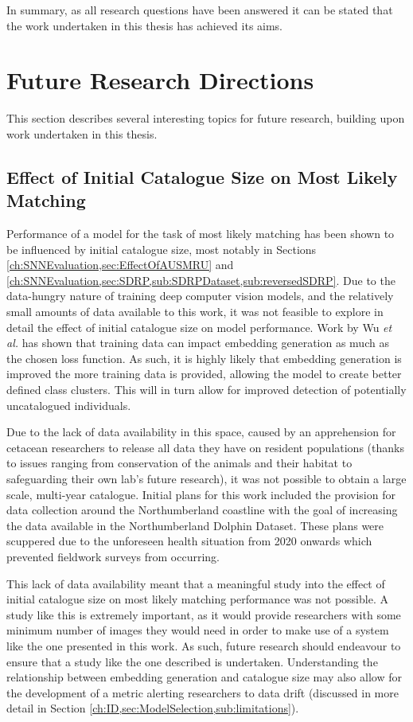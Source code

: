 In summary, as all research questions have been answered it can be stated that the work undertaken in this thesis has achieved its aims. 

\section{Future Research Directions}\label{ch:Conclusion,sec:FutureWork}

This section describes several interesting topics for future research, building upon work undertaken in this thesis.

\subsection{Effect of Initial Catalogue Size on Most Likely Matching}\label{ch:Conclusion,sec:FutureWork,sub:EffectOfCatalogueSize}

Performance of a model for the task of most likely matching has been shown to be influenced by initial catalogue size, most notably in Sections \ref{ch:SNNEvaluation,sec:EffectOfAUSMRU} and \ref{ch:SNNEvaluation,sec:SDRP,sub:SDRPDataset,sub:reversedSDRP}. Due to the data-hungry nature of training deep computer vision models, and the relatively small amounts of data available to this work, it was not feasible to explore in detail the effect of initial catalogue size on model performance. Work by Wu \textit{et al.} \cite{wu_sampling_2017} has shown that training data can impact embedding generation as much as the chosen loss function. As such, it is highly likely that embedding generation is improved the more training data is provided, allowing the model to create better defined class clusters. This will in turn allow for improved detection of potentially uncatalogued individuals. 

Due to the lack of data availability in this space, caused by an apprehension for cetacean researchers to release all data they have on resident populations (thanks to issues ranging from conservation of the animals and their habitat to safeguarding their own lab's future research), it was not possible to obtain a large scale, multi-year catalogue. Initial plans for this work included the provision for data collection around the Northumberland coastline with the goal of increasing the data available in the Northumberland Dolphin Dataset. These plans were scuppered due to the unforeseen health situation from 2020 onwards which prevented fieldwork surveys from occurring. 

This lack of data availability meant that a meaningful study into the effect of initial catalogue size on most likely matching performance was not possible. A study like this is extremely important, as it would provide researchers with some minimum number of images they would need in order to make use of a system like the one presented in this work. As such, future research should endeavour to ensure that a study like the one described is undertaken. Understanding the relationship between embedding generation and catalogue size may also allow for the development of a metric alerting researchers to data drift (discussed in more detail in Section \ref{ch:ID,sec:ModelSelection,sub:limitations}).


